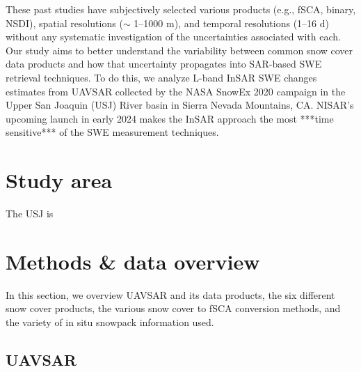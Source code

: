 These past studies have subjectively selected various products (e.g., fSCA, binary, NSDI), spatial resolutions ($\sim$ 1--1000 m), and temporal resolutions (1--16 d) without any systematic investigation of the uncertainties associated with each. Our study aims to better understand the variability between common snow cover data products and how that uncertainty propagates into SAR-based SWE retrieval techniques. To do this, we analyze L-band InSAR SWE changes estimates from UAVSAR collected by the NASA SnowEx 2020 \cite{marshallNASASnowEx20202019} campaign in the Upper San Joaquin (USJ) River basin in Sierra Nevada Mountains, CA. NISAR's upcoming launch in early 2024 makes the InSAR approach the most ***time sensitive*** of the SWE measurement techniques.



\hypertarget{ch4-methods}{\section{Study area}\label{ch4-methods}}

The USJ is 

\hypertarget{ch4-methods}{\section{Methods \& data overview}\label{ch4-methods}}
In this section, we overview UAVSAR and its data products, the six different snow cover products, the various snow cover to fSCA conversion methods, and the variety of in situ snowpack information used.

\hypertarget{ch4-methods-1}{\subsection{UAVSAR}\label{ch4-methods-1}}

